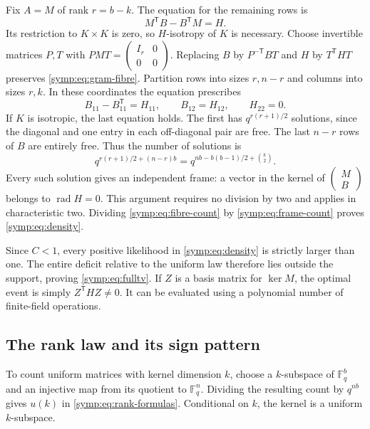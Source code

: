 Fix $A=M$ of rank $r=b-k$.  The equation for the remaining rows is
\begin{equation}
 M^{\mathsf T}B-B^{\mathsf T}M=H.
 \label{symp:eq:gram-fibre}
\end{equation}
Its restriction to $K\times K$ is zero, so $H$-isotropy of $K$ is necessary.
Choose invertible matrices $P,T$ with
$PMT=\left(\begin{smallmatrix}I_r&0\\0&0\end{smallmatrix}\right)$.
Replacing $B$ by $P^{-\mathsf T}BT$ and $H$ by $T^{\mathsf T}HT$ preserves
\eqref{symp:eq:gram-fibre}.  Partition rows into sizes $r,n-r$ and columns
into sizes $r,k$.  In these coordinates the equation prescribes
\[
 B_{11}-B_{11}^{\mathsf T}=H_{11},\qquad B_{12}=H_{12},
 \qquad H_{22}=0.
\]
If $K$ is isotropic, the last equation holds.  The first has
$q^{r(r+1)/2}$ solutions, since the diagonal and one entry in each
off-diagonal pair are free.  The last $n-r$ rows of $B$ are entirely free.
Thus the number of solutions is
\begin{equation}
 q^{r(r+1)/2+(n-r)b}
  =q^{nb-b(b-1)/2+\binom{k}{2}}.
 \label{symp:eq:fibre-count}
\end{equation}
Every such solution gives an independent frame: a vector in the kernel of
$\left(\begin{smallmatrix}M\\B\end{smallmatrix}\right)$ belongs to
$\operatorname{rad}H=0$.  This argument requires no division by two and
applies in characteristic two.  Dividing \eqref{symp:eq:fibre-count} by
\eqref{symp:eq:frame-count} proves \eqref{symp:eq:density}.

Since $C<1$, every positive likelihood in \eqref{symp:eq:density} is
strictly larger than one.  The entire deficit relative to the uniform law
therefore lies outside the support, proving \eqref{symp:eq:fulltv}.  If $Z$
is a basis matrix for $\ker M$, the optimal event is simply
$Z^{\mathsf T}HZ\ne0$.  It can be evaluated using a polynomial number of
finite-field operations.

\subsection{The rank law and its sign pattern}

To count uniform matrices with kernel dimension $k$, choose a $k$-subspace
of $\mathbb F_q^b$ and an injective map from its quotient to
$\mathbb F_q^n$.  Dividing the resulting count by $q^{nb}$ gives $u(k)$
in \eqref{symp:eq:rank-formulas}.  Conditional on $k$, the kernel is a
uniform $k$-subspace.

